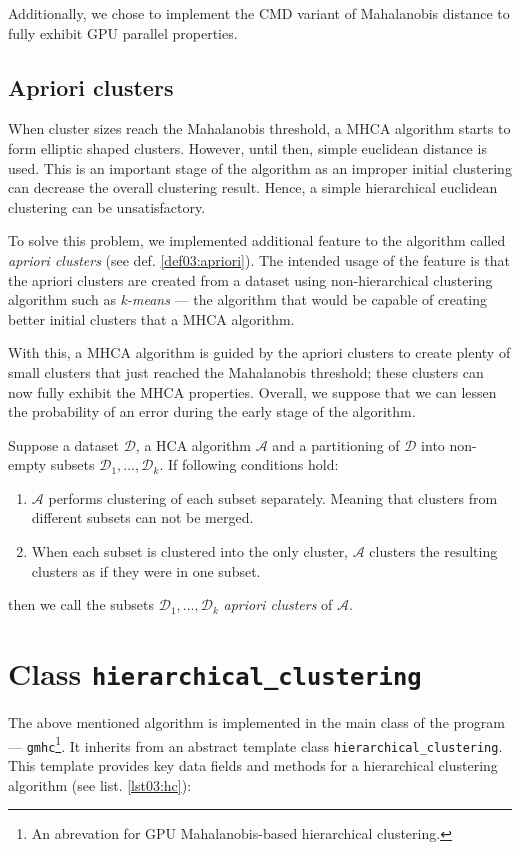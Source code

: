 Additionally, we chose to implement the CMD variant of Mahalanobis distance to fully exhibit GPU parallel properties.

\subsection{Apriori clusters}

When cluster sizes reach the Mahalanobis threshold, a MHCA algorithm starts to form elliptic shaped clusters. However, until then, simple euclidean distance is used. This is an important stage of the algorithm as an improper initial clustering can decrease the overall clustering result. Hence, a simple hierarchical euclidean clustering can be unsatisfactory.

To solve this problem, we implemented additional feature to the algorithm called \emph{apriori clusters} (see def. \ref{def03:apriori}). The intended usage of the feature is that the apriori clusters are created from a dataset using non-hierarchical clustering algorithm such as \emph{k-means} --- the algorithm that would be capable of creating better initial clusters that a MHCA algorithm. 

With this, a MHCA algorithm is guided by the apriori clusters to create plenty of small clusters that just reached the Mahalanobis threshold; these clusters can now fully exhibit the MHCA properties. Overall, we suppose that we can lessen the probability of an error during the early stage of the algorithm.

\begin{defn}
	Suppose a dataset $\mathcal{D}$, a HCA algorithm $\mathcal{A}$ and a partitioning of  $\mathcal{D}$ into non-empty subsets $\mathcal{D}_1,\dots,\mathcal{D}_k$. If following conditions hold:
	\begin{enumerate}
		\item $\mathcal{A}$ performs clustering of each subset separately. Meaning that clusters from different subsets can not be merged.
		\item When each subset is clustered into the only cluster, $\mathcal{A}$ clusters the resulting clusters as if they were in one subset.
	\end{enumerate}
	then we call the subsets $\mathcal{D}_1,\dots,\mathcal{D}_k$ \emph{apriori clusters} of $\mathcal{A}$.
	\label{def03:apriori}
\end{defn}



\section{Class \texttt{hierarchical\_clustering}}
The above mentioned algorithm is implemented in the main class of the program --- \texttt{gmhc}\footnote{An abrevation for GPU Mahalanobis-based hierarchical clustering.}. It inherits from an abstract template class \texttt{hierarchical\_clustering}.
This template provides key data fields and methods for a hierarchical clustering algorithm (see list. \ref{lst03:hc}): 

